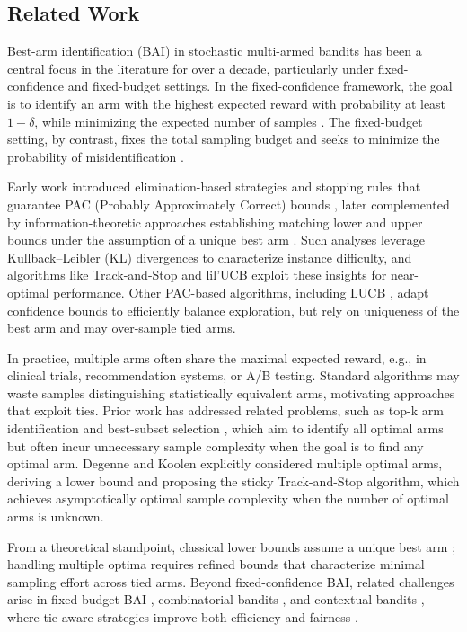 \documentclass[final]{IEEEtran}
\begin{document}
\subsection{Related Work}
Best-arm identification (BAI) in stochastic multi-armed bandits has been a central focus in the literature for over a decade, particularly under fixed-confidence and fixed-budget settings. In the fixed-confidence framework, the goal is to identify an arm with the highest expected reward with probability at least $1-\delta$, while minimizing the expected number of samples \cite{even2006action, garivier2016optimal}. The fixed-budget setting, by contrast, fixes the total sampling budget and seeks to minimize the probability of misidentification \cite{gabillon2012best}.

Early work introduced elimination-based strategies and stopping rules that guarantee PAC (Probably Approximately Correct) bounds \cite{even2006action}, later complemented by information-theoretic approaches establishing matching lower and upper bounds under the assumption of a unique best arm \cite{garivier2016optimal}. Such analyses leverage Kullback–Leibler (KL) divergences to characterize instance difficulty, and algorithms like Track-and-Stop \cite{garivier2016optimal} and lil’UCB \cite{jamieson2014lil} exploit these insights for near-optimal performance. Other PAC-based algorithms, including LUCB \cite{kalyanakrishnan2012pac}, adapt confidence bounds to efficiently balance exploration, but rely on uniqueness of the best arm and may over-sample tied arms.

In practice, multiple arms often share the maximal expected reward, e.g., in clinical trials, recommendation systems, or A/B testing. Standard algorithms may waste samples distinguishing statistically equivalent arms, motivating approaches that exploit ties. Prior work has addressed related problems, such as top-k arm identification and best-subset selection \cite{gabillon2012best, chen2014combinatorial, jamieson2014bandit}, which aim to identify all optimal arms but often incur unnecessary sample complexity when the goal is to find any optimal arm. Degenne and Koolen \cite{Degenne2019PureEW} explicitly considered multiple optimal arms, deriving a lower bound and proposing the sticky Track-and-Stop algorithm, which achieves asymptotically optimal sample complexity when the number of optimal arms is unknown.

From a theoretical standpoint, classical lower bounds assume a unique best arm \cite{garivier2016optimal}; handling multiple optima requires refined bounds that characterize minimal sampling effort across tied arms. Beyond fixed-confidence BAI, related challenges arise in fixed-budget BAI \cite{gabillon2012best, chen2014combinatorial}, combinatorial bandits \cite{chen2014combinatorial}, and contextual bandits \cite{simchi2021best}, where tie-aware strategies improve both efficiency and fairness \cite{xu2021fairness}.
\end{document}
